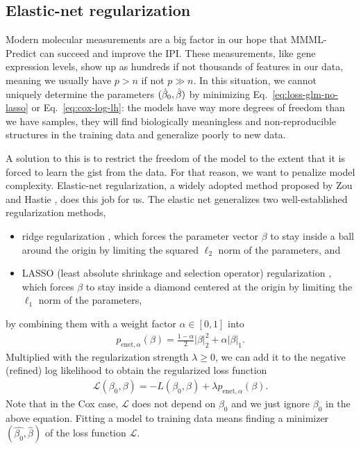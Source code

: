 \subsection{Elastic-net regularization} \label{subsec:elastic-net}

Modern molecular measurements are a big factor in our hope that MMML-Predict can succeed and improve 
the IPI. These measurements, like gene expression levels, show up as hundreds if not thousands of 
features in our data, meaning we usually have $p > n$ if not $p \gg n$. In this situation, we 
cannot uniquely determine the parameters $(\hat{\beta}_0, \hat{\beta})$ by minimizing 
Eq.\ \eqref{eq:loss-glm-no-lasso} or Eq.\ \eqref{eq:cox-log-lh}:
the models have way more degrees of freedom than we have samples, they will find biologically 
meaningless and non-reproducible structures in the training data and generalize poorly to new 
data.

A solution to this is to restrict the freedom of the model to the extent that it is forced to 
learn the gist from the data. For that reason, we want to penalize model complexity. Elastic-net 
regularization, a widely adopted method proposed by Zou and Hastie \cite{elasticnet05}, does this 
job for us. The elastic net generalizes two well-established regularization methods,
\begin{itemize}
    \item ridge regularization \cite{ridge70}, which forces the parameter vector $\beta$ to 
        stay inside a ball around the origin by limiting the squared $\ell_2$ norm 
        of the parameters, and 
    \item LASSO (least absolute shrinkage and selection operator) regularization \cite{lasso18}, 
        which forces $\beta$ to stay inside a diamond centered at the origin by limiting the 
        $\ell_1$ norm of the parameters,
\end{itemize}
by combining them with a weight factor $\alpha \in [0, 1]$ into 
\begin{align}
    p_{\text{enet}, \alpha}(\beta) = \frac{1-\alpha}{2} |\beta|_2^2 + \alpha |\beta|_1.
\end{align}
Multiplied with the regularization strength $\lambda \geq 0$, we can add it to the negative 
(refined) log likelihood to obtain the regularized loss function
\begin{align}
    \mathcal{L}(\beta_0, \beta) = -L(\beta_0, \beta) + \lambda p_{\text{enet}, \alpha}(\beta).
\end{align}
Note that in the Cox case, $\mathcal{L}$ does not depend on $\beta_0$ and we just ignore $\beta_0$ 
in the above equation. Fitting a model to training data means finding a minimizer $(\hat{\beta_0}, 
\hat{\beta})$ of the loss function $\mathcal{L}$.


